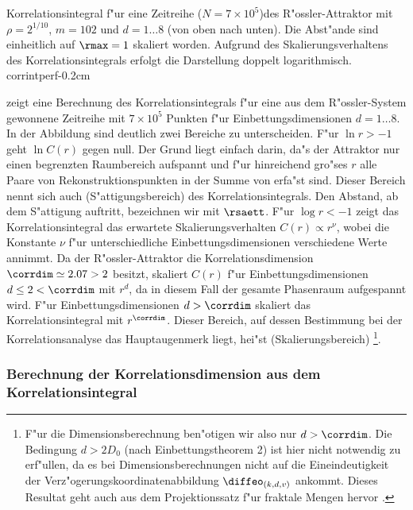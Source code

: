 {Korrelationsintegral f"ur eine Zeitreihe ($N=7\times 10^5$)des R"ossler-Attraktor mit $\rho=2^{1/10}$,
$m=102$ und $d=1\dots 8$ (von oben nach unten). Die Abst"ande sind einheitlich auf
$\rmax=1$ skaliert worden. Aufgrund des Skalierungsverhaltens des
Korrelationsintegrals erfolgt die Darstellung doppelt logarithmisch.} 
{corrintperf}{-0.2cm}

 zeigt eine Berechnung des Korrelationsintegrals f"ur eine aus dem
R"ossler-System \cite{Roessler76} gewonnene Zeitreihe mit $7\times 10^5$ Punkten 
f"ur Einbettungsdimensionen $d=1\dots 8$. In der Abbildung sind deutlich zwei Bereiche zu
unterscheiden. F"ur $\ln r>-1$ geht $\ln C(r)$ gegen null. Der Grund liegt einfach
darin, da"s der Attraktor nur einen begrenzten Raumbereich aufspannt und f"ur hinreichend
gro"ses $r$ alle Paare von Rekonstruktionspunkten  in der Summe von 
erfa"st sind. Dieser Bereich nennt sich auch \begriff(S"attigungsbereich) des
Korrelationsintegrals. Den Abstand, ab dem S"attigung auftritt, bezeichnen wir mit
$\rsaett$. F"ur $\log r<-1$ zeigt das Korrelationsintegral das 
 erwartete Skalierungsverhalten $C(r)\propto r^\nu$, wobei die Konstante
$\nu$ f"ur unterschiedliche Einbettungsdimensionen verschiedene Werte annimmt. Da der
R"ossler-Attraktor die Korrelationsdimension $\corrdim\simeq 2.07>2$ besitzt, skaliert $C(r)$
f"ur Einbettungsdimensionen $d\leq 2<\corrdim$ mit $r^d$, da in diesem Fall der gesamte Phasenraum
aufgespannt wird. F"ur Einbettungsdimensionen $d>\corrdim$ skaliert das Korrelationsintegral
mit $r^{\corrdim}$. Dieser Bereich, auf dessen Bestimmung bei der Korrelationsanalyse das
Hauptaugenmerk liegt, hei"st \begriff(Skalierungsbereich)
\footnote{F"ur die Dimensionsberechnung ben"otigen wir also nur $d>\corrdim$. Die Bedingung
$d>2D_0$ (nach Einbettungstheorem 2) ist hier nicht notwendig zu erf"ullen, da es bei
Dimensionsberechnungen nicht auf die Eineindeutigkeit der
Verz"ogerungskoordinatenabbildung  $\diffeo_{(k,d,v)}$ ankommt. Dieses Resultat geht
auch aus dem Projektionssatz f"ur fraktale Mengen hervor \cite{Falconer90}.}.

\subsubsection{Berechnung der Korrelationsdimension aus dem Korrelationsintegral}
